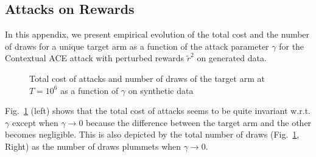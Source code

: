 \subsection{Attacks on Rewards}\label{app:additional_fig_rwds}
In this appendix, we present empirical evolution of the total cost and the number of draws for a unique target arm as a function of the attack parameter $\gamma$ for the Contextual ACE attack with perturbed rewards $\tilde{r}^{2}$ on generated data.

\begin{figure}[htbp]
    \centering
    \caption{Total cost of attacks and number of draws of the target arm at $T = 10^{6}$ as a function of $\gamma$ on synthetic data     \label{fig:synth_cost_draws_gamma}
}
\end{figure}

Fig.~\ref{fig:synth_cost_draws_gamma} (left) shows that the total cost of attacks seems to be quite invariant w.r.t.  $\gamma$ except when $\gamma \rightarrow 0$ because the difference between the target arm and the other becomes negligible. This is also depicted by the total number of draws (Fig.~\ref{fig:synth_cost_draws_gamma}, Right) as the number of draws plummets when $\gamma \rightarrow 0$.

